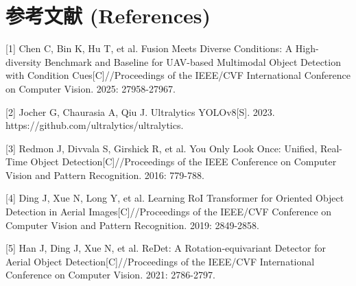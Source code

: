 \documentclass[utf8,a4paper,zihao=-4]{ctexart}
\begin{document}
\section*{参考文献 (References)}
[1] Chen C, Bin K, Hu T, et al. Fusion Meets Diverse Conditions: A High-diversity Benchmark and Baseline for UAV-based Multimodal Object Detection with Condition Cues[C]//Proceedings of the IEEE/CVF International Conference on Computer Vision. 2025: 27958-27967.

[2] Jocher G, Chaurasia A, Qiu J. Ultralytics YOLOv8[S]. 2023. https://github.com/ultralytics/ultralytics.

[3] Redmon J, Divvala S, Girshick R, et al. You Only Look Once: Unified, Real-Time Object Detection[C]//Proceedings of the IEEE Conference on Computer Vision and Pattern Recognition. 2016: 779-788.

[4] Ding J, Xue N, Long Y, et al. Learning RoI Transformer for Oriented Object Detection in Aerial Images[C]//Proceedings of the IEEE/CVF Conference on Computer Vision and Pattern Recognition. 2019: 2849-2858.

[5] Han J, Ding J, Xue N, et al. ReDet: A Rotation-equivariant Detector for Aerial Object Detection[C]//Proceedings of the IEEE/CVF International Conference on Computer Vision. 2021: 2786-2797.
\end{document}
